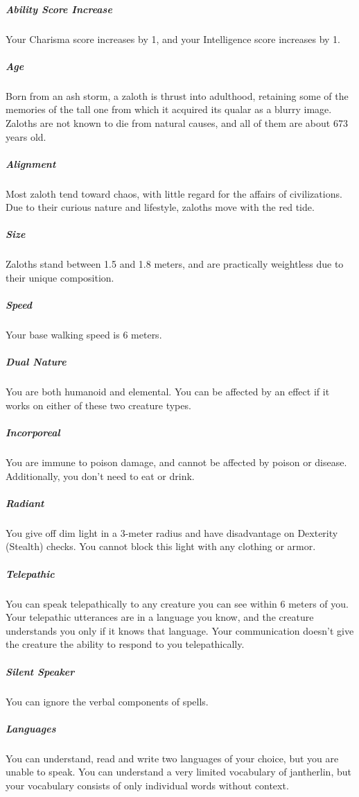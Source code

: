     \subparagraph{Ability Score Increase}
        Your Charisma score increases by 1, and your Intelligence score increases by 1.

    \subparagraph{Age}
        Born from an ash storm, a zaloth is thrust into adulthood, retaining some of the memories of the tall one from which it acquired its qualar as a blurry image.
        Zaloths are not known to die from natural causes, and all of them are about 673 years old.

    \subparagraph{Alignment}
        Most zaloth tend toward chaos, with little regard for the affairs of civilizations.
        Due to their curious nature and lifestyle, zaloths move with the red tide.

    \subparagraph{Size}
        Zaloths stand between 1.5 and 1.8 meters, and are practically weightless due to their unique composition.

    \subparagraph{Speed}
        Your base walking speed is 6 meters.

    \subparagraph{Dual Nature}
        You are both humanoid and elemental.
        You can be affected by an effect if it works on either of these two creature types.

    \subparagraph{Incorporeal}
        You are immune to poison damage, and cannot be affected by poison or disease.
        Additionally, you don't need to eat or drink.


    \subparagraph{Radiant}
        You give off dim light in a 3-meter radius and have disadvantage on Dexterity (Stealth) checks.
        You cannot block this light with any clothing or armor.

    \subparagraph{Telepathic}
        You can speak telepathically to any creature you can see within 6 meters of you.
        Your telepathic utterances are in a language you know, and the creature understands you only if it knows that language.
        Your communication doesn't give the creature the ability to respond to you telepathically.

    \subparagraph{Silent Speaker}
        You can ignore the verbal components of spells.

    \subparagraph{Languages}
        You can understand, read and write two languages of your choice, but you are unable to speak.
        You can understand a very limited vocabulary of jantherlin, but your vocabulary consists of only individual words without context.

